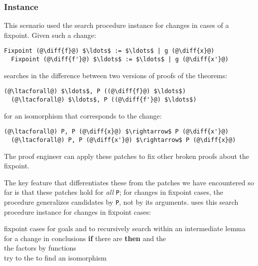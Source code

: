 \subsubsection*{Instance}

This scenario used the search procedure instance for changes in cases of a fixpoint.
Given such a change:

\begin{lstlisting}[language=coq]
  Fixpoint (@\diff{f}@) $\ldots$ := $\ldots$ | g (@\diff{x}@)
  Fixpoint (@\diff{f'}@) $\ldots$ := $\ldots$ | g (@\diff{x'}@)
\end{lstlisting}
\sysname searches in the difference between two versions of proofs of the theorems:

\begin{lstlisting}[language=coq]
  (@\ltacforall@) $\ldots$, P ((@\diff{f}@) $\ldots$)
  (@\ltacforall@) $\ldots$, P ((@\diff{f'}@) $\ldots$)
\end{lstlisting}
for an isomorphism that corresponds to the change:

\begin{lstlisting}[language=coq]
  (@\ltacforall@) P, P (@\diff{x}@) $\rightarrow$ P (@\diff{x'}@)
  (@\ltacforall@) P, P (@\diff{x'}@) $\rightarrow$ P (@\diff{x}@)
\end{lstlisting}
The proof engineer can apply these patches to fix other broken proofs about the fixpoint.

The key feature that differentiates these from the patches we have encountered so far is that
these patches hold for \emph{all} \lstinline{P}; for changes in fixpoint cases, the procedure generalizes
candidates by \lstinline{P}, not by its arguments.
\sysname uses this search procedure instance for changes in fixpoint cases:

\begin{algorithm}
\footnotesize
\begin{algorithmic}[1]
    \STATE {} fixpoint cases for goals
    \STATE {} and  to recursively search within an intermediate lemma for a change in conclusions
    \STATE \textbf{if} there are  \textbf{then}
    \STATE \hspace*{1em}  and  the  \\
           \hspace*{1em}  the factors by functions \\
           \hspace*{1em} try to  the  to find an isomorphism 
\end{algorithmic}
\end{algorithm}

